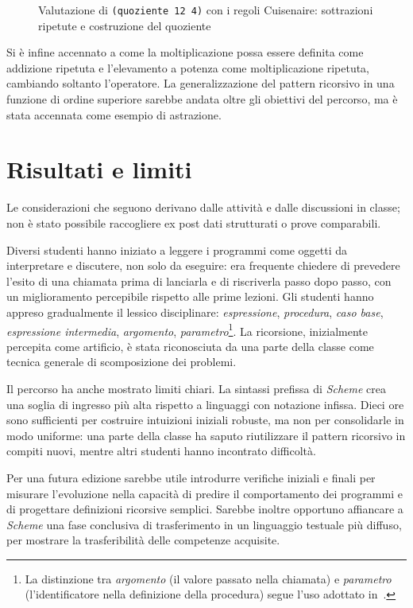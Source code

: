 \documentclass[withtimes]{easychair}
\begin{document}
\begin{figure}[!htb]
    \centering
    
    \caption{Valutazione di \texttt{(quoziente 12 4)} con i regoli Cuisenaire: sottrazioni ripetute e costruzione del quoziente\label{fig:quoziente-regoli}}
\end{figure}

Si è infine accennato a come la moltiplicazione possa essere definita come addizione ripetuta e l'elevamento a potenza come moltiplicazione ripetuta, cambiando soltanto l'operatore. La generalizzazione del pattern ricorsivo in una funzione di ordine superiore sarebbe andata oltre gli obiettivi del percorso, ma è stata accennata come esempio di astrazione.

\section{Risultati e limiti}\label{conclusioni}

Le considerazioni che seguono derivano dalle attività e dalle discussioni in classe; non è stato possibile raccogliere ex post dati strutturati o prove comparabili.

Diversi studenti hanno iniziato a leggere i programmi come oggetti da interpretare e discutere, non solo da eseguire: era frequente chiedere di prevedere l'esito di una chiamata prima di lanciarla e di riscriverla passo dopo passo, con un miglioramento percepibile rispetto alle prime lezioni.
Gli studenti hanno appreso gradualmente il lessico disciplinare: \emph{espressione}, \emph{procedura}, \emph{caso base}, \emph{espressione intermedia}, \emph{argomento}, \emph{parametro}\footnote{La distinzione tra \emph{argomento} (il valore passato nella chiamata) e \emph{parametro} (l'identificatore nella definizione della procedura) segue l'uso adottato in~\cite{Abelson1996,Felleisen2018}.}. La ricorsione, inizialmente percepita come artificio, è stata riconosciuta da una parte della classe come tecnica generale di scomposizione dei problemi.

Il percorso ha anche mostrato limiti chiari. La sintassi prefissa di \emph{Scheme} crea una soglia di ingresso più alta rispetto a linguaggi con notazione infissa. Dieci ore sono sufficienti per costruire intuizioni iniziali robuste, ma non per consolidarle in modo uniforme: una parte della classe ha saputo riutilizzare il pattern ricorsivo in compiti nuovi, mentre altri studenti hanno incontrato difficoltà.

Per una futura edizione sarebbe utile introdurre verifiche iniziali e finali per misurare l'evoluzione nella capacità di predire il comportamento dei programmi e di progettare definizioni ricorsive semplici. Sarebbe inoltre opportuno affiancare a \emph{Scheme} una fase conclusiva di trasferimento in un linguaggio testuale più diffuso, per mostrare la trasferibilità delle competenze acquisite.
\end{document}
